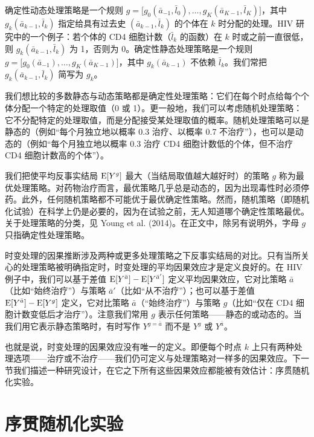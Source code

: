 \begin{finepoint}[确定性与随机处理策略]
确定性动态处理策略是一个规则 $g=\bigl[g_0(\bar{a}_{-1},\bar{l}_0),\ldots,g_K(\bar{a}_{K-1},\bar{l}_K)\bigr]$，其中 $g_k(\bar{a}_{k-1},\bar{l}_k)$ 指定给具有过去史 $(\bar{a}_{k-1},\bar{l}_k)$ 的个体在 $k$ 时分配的处理。HIV 研究中的一个例子：若个体的 CD4 细胞计数（$\bar{l}_k$ 的函数）在 $k$ 时或之前一直很低，则 $g_k(\bar{a}_{k-1},\bar{l}_k)$ 为 1，否则为 0。确定性静态处理策略是一个规则 $g=\bigl[g_0(\bar{a}_{-1}),\ldots,g_K(\bar{a}_{K-1})\bigr]$，其中 $g_k(\bar{a}_{k-1})$ 不依赖 $\bar{l}_k$。我们常把 $g_k(\bar{a}_{k-1},\bar{l}_k)$ 简写为 $g_k$。

我们想比较的多数静态与动态策略都是确定性处理策略：它们在每个时点给每个个体分配一个特定的处理取值（0 或 1）。更一般地，我们可以考虑随机处理策略：它不分配特定的处理取值，而是分配接受某处理取值的概率。随机处理策略可以是静态的（例如“每个月独立地以概率 0.3 治疗、以概率 0.7 不治疗”），也可以是动态的（例如“每个月独立地以概率 0.3 治疗 CD4 细胞计数低的个体，但不治疗 CD4 细胞计数高的个体”）。

我们把使平均反事实结局 $\mathrm{E}[Y^g]$ 最大（当结局取值越大越好时）的策略 $g$ 称为最优处理策略。对药物治疗而言，最优策略几乎总是动态的，因为出现毒性时必须停药。此外，任何随机策略都不可能优于最优确定性策略。然而，随机策略（即随机化试验）在科学上仍是必要的，因为在试验之前，无人知道哪个确定性策略最优。关于处理策略的分类，见 Young et al. (2014)。在正文中，除另有说明外，字母 $g$ 只指确定性处理策略。
\end{finepoint}

时变处理的因果推断涉及两种或更多处理策略之下反事实结局的对比。只有当所关心的处理策略被明确指定时，时变处理的平均因果效应才是定义良好的。在 HIV 例子中，我们可以基于差值 $\mathrm{E}[Y^{\bar{a}}]-\mathrm{E}[Y^{\bar{a}'}]$ 定义平均因果效应，它对比策略 $\bar{a}$（比如“始终治疗”）与策略 $\bar{a}'$（比如“从不治疗”）；也可以基于差值 $\mathrm{E}[Y^{\bar{a}}]-\mathrm{E}[Y^{g}]$ 定义，它对比策略 $\bar{a}$（“始终治疗”）与策略 $g$（比如“仅在 CD4 细胞计数变低后才治疗”）。注意我们常用 $g$ 表示任何策略——静态的或动态的。当我们用它表示静态策略时，有时写作 $Y^{g=\bar{a}}$ 而不是 $Y^g$ 或 $Y^{\bar{a}}$。

也就是说，时变处理的因果效应没有唯一的定义。即便每个时点 $k$ 上只有两种处理选项——治疗或不治疗——我们仍可定义与处理策略对一样多的因果效应。下一节我们描述一种研究设计，在它之下所有这些因果效应都能被有效估计：序贯随机化实验。

\section{序贯随机化实验}

